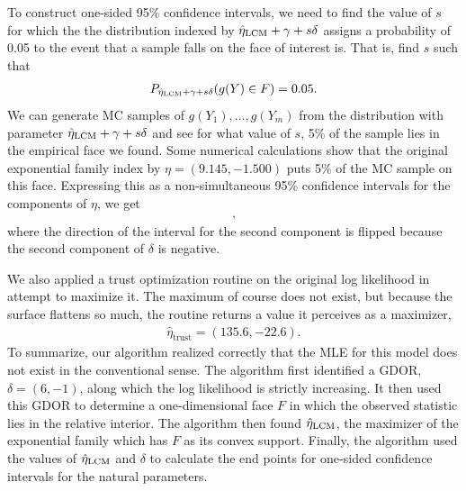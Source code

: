 To construct one-sided 95\% confidence intervals, we need to find the value of 
$s$ for which the the distribution indexed by $\hat{\eta}_{\textrm{LCM}} + \gamma + s \delta$ 
assigns a probability of 0.05 to the event that a sample falls on the 
face of interest is.  That is, find $s$ such that
\begin{align*}
P_{\hat{\eta}_{\textrm{LCM}} + \gamma + s \delta}(g(Y) \in F ) = 0.05.
\end{align*}
We can generate MC samples 
of $g(Y_1), \ldots, g(Y_m)$ from the distribution with parameter $\hat{\eta}_{\textrm{LCM}} + \gamma + s 
\delta$ and see for what value of $s$, 5\% of the sample lies in the 
empirical face we found.  Some numerical calculations show that the original
 exponential family index by $\eta = (9.145, -1.500)$ puts 5\% of
  the MC sample on this face.  
Expressing this as a non-simultaneous 95\% confidence intervals for the components of $\eta$, we get
\begin{align*}
	[9.145, +\infty)\\
	(-\infty, -1.500],
\end{align*}
where the direction of the interval for the second component is flipped because the 
second component of $\delta$ is negative.

We also applied a trust optimization routine on the original log 
likelihood in attempt to maximize it.  The maximum of course does not exist, but
because the surface flattens so much, the routine returns a value it perceives as a maximizer,  
\begin{align*}
 	\hat{\eta}_{\textrm{trust}} = (135.6, -22.6).
 \end{align*}
To summarize, our algorithm realized correctly that the MLE for 
this model does not exist in the conventional sense.
The algorithm first identified a GDOR, $\delta = (6,-1)$, along which 
the log likelihood is strictly increasing.  It then used this GDOR to determine
a one-dimensional face $F$ in which the observed statistic lies 
in the relative interior.  The algorithm then found $\hat{\eta}_{\textrm{LCM}}$, the 
maximizer of the exponential family
which has $F$ as its convex support.  Finally, the algorithm used the
values of $\hat{\eta}_{\textrm{LCM}}$ and $\delta$ to calculate the end points for 
one-sided confidence intervals for the natural parameters.


